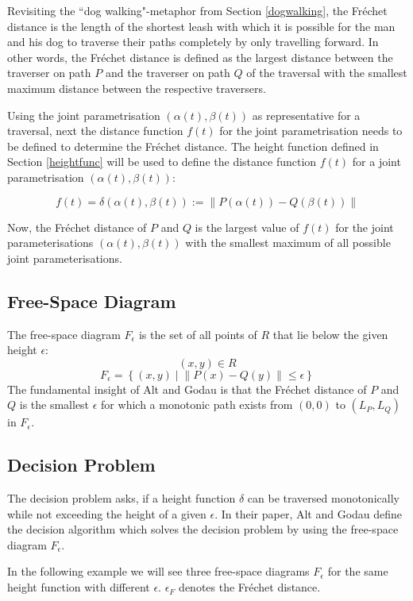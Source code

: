 Revisiting the ``dog walking"-metaphor from Section \ref{dogwalking}, the Fréchet distance is the length of the shortest leash with which it is possible for the man and his dog to traverse their paths completely by only travelling forward. In other words, the Fréchet distance is defined as the largest distance between the traverser on path $P$ and the traverser on path $Q$ of the traversal with the smallest maximum distance between the respective traversers.

Using the joint parametrisation $(\alpha(t), \beta(t))$ as representative for a traversal, next the distance function $f(t)$ for the joint parametrisation needs to be defined to determine the Fréchet distance. The height function defined in Section \ref{heightfunc} will be used to define the distance function $f(t)$ for a joint parametrisation $(\alpha(t), \beta(t))$:

$$f(t) = \delta(\alpha(t), \beta(t)) := \left\| P(\alpha(t)) - Q(\beta(t)) \right\|$$

Now, the Fréchet distance of $P$ and $Q$ is the largest value of $f(t)$ for the joint parameterisations $(\alpha(t), \beta(t))$ with the smallest maximum of all possible joint parameterisations.

\subsection{Free-Space Diagram}
The free-space diagram  $F_\epsilon$ is the set of all points of $R$ that lie below the given height $\epsilon$:
$$(x, y) \in R$$
$$F_\epsilon = \left\{ (x, y) \mid \left\| P(x) - Q(y) \right\| \leq \epsilon \right\}$$
The fundamental insight of Alt and Godau\cite{altgodau} is that the Fréchet distance of $P$ and $Q$ is the smallest $\epsilon$ for which a monotonic path exists from $(0,0)$ to $(L_P, L_Q)$ in $F_\epsilon$.\cite{rotelex}

\subsection{Decision Problem}

The decision problem asks, if a height function $\delta$ can be traversed monotonically while not exceeding the height of a given $\epsilon$. In their paper, Alt and Godau\cite{altgodau} define the decision algorithm which solves the decision problem by using the free-space diagram $F_{\epsilon}$.

In the following example we will see three free-space diagrams $F_\epsilon$ for the same height function with different $\epsilon$. $\epsilon_F$ denotes the Fréchet distance.

